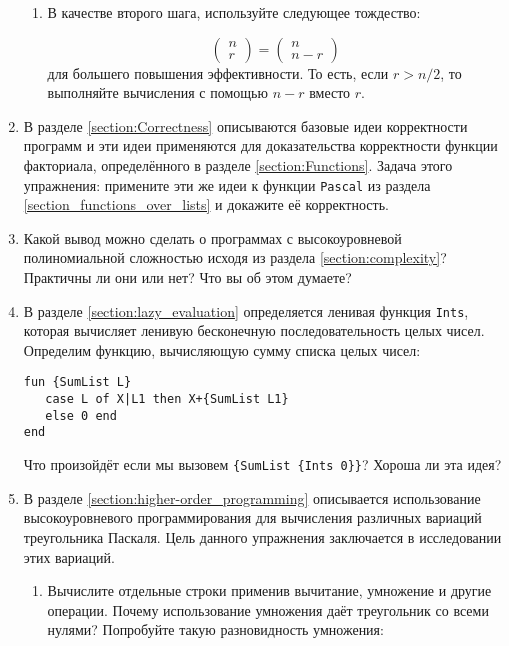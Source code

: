 \begin{enumerate}
{\begin{enumerate}
  \item{В качестве второго шага, используйте следующее тождество:
    
    $$
    \begin{pmatrix}
      n \\
      r
    \end{pmatrix}
    =
    \begin{pmatrix}
      n \\
      n - r
    \end{pmatrix}
    $$
для большего повышения эффективности. То есть, если $r > n/2$, то выполняйте вычисления с помощью $n - r$ вместо $r$.
  }
  \end{enumerate}

}

\item{В разделе \ref{section:Correctness} описываются базовые идеи корректности программ и эти идеи применяются для доказательства корректности функции факториала, определённого в разделе \ref{section:Functions}. Задача этого упражнения: примените эти же идеи к функции \lstinline|Pascal| из раздела \ref{section_functions_over_lists} и докажите её корректность.}

\item{Какой вывод можно сделать о программах с высокоуровневой полиномиальной сложностью исходя из раздела \ref{section:complexity}? Практичны ли они или нет? Что вы об этом думаете?}

\item{В разделе \ref{section:lazy_evaluation} определяется ленивая функция \lstinline|Ints|, которая вычисляет ленивую бесконечную последовательность целых чисел. Определим функцию, вычисляющую сумму списка целых чисел:

\begin{lstlisting}
fun {SumList L}
   case L of X|L1 then X+{SumList L1}
   else 0 end
end
\end{lstlisting}

Что произойдёт если мы вызовем \lstinline|{SumList {Ints 0}}|? Хороша ли эта идея?
}

\item{
В разделе \ref{section:higher-order_programming} описывается использование высокоуровневого программирования для вычисления различных вариаций треугольника Паскаля. Цель данного упражнения заключается в исследовании этих вариаций.

\begin{enumerate}

\item{
Вычислите отдельные строки применив вычитание, умножение и другие операции. Почему использование умножения даёт треугольник со всеми нулями? Попробуйте такую разновидность умножения:

}
\end{enumerate}}
\end{enumerate}
